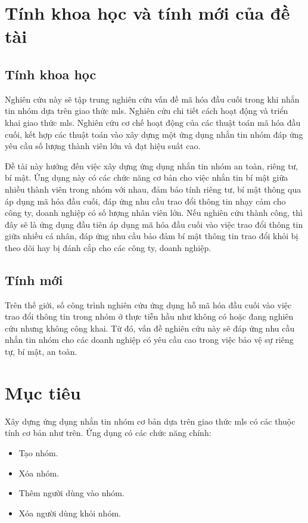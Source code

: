 \documentclass[../main-report.tex]{subfiles}
\begin{document}
\section{Tính khoa học và tính mới của đề tài}
\subsection{Tính khoa học}

Nghiên cứu này sẽ tập trung nghiên cứu vấn đề mã hóa đầu cuối trong khi nhắn tin nhóm dựa trên giao thức \acrshort{mls}. Nghiên cứu chi tiết cách hoạt động và triển khai giao thức \acrshort{mls}. Nghiên cứu cơ chế hoạt động của các thuật toán mã hóa đầu cuối, kết hợp các thuật toán vào xây dựng một ứng dụng nhắn tin nhóm đáp ứng yêu cầu số lượng thành viên lớn và đạt hiệu suất cao.

Đề tài này hướng đến việc xây dựng ứng dụng nhắn tin nhóm an toàn, riêng tư, bí mật. Ứng dụng này có các chức năng cơ bản cho việc nhắn tin bí mật giữa nhiều thành viên trong nhóm với nhau, đảm bảo tính riêng tư, bí mật thông qua áp dụng mã hóa đầu cuối, đáp ứng nhu cầu trao đổi thông tin nhạy cảm cho công ty, doanh nghiệp có số lượng nhân viên lớn. Nếu nghiên cứu thành công, thì đây sẽ là ứng dụng đầu tiên áp dụng mã hóa đầu cuối vào việc trao đổi thông tin giữa nhiều cá nhân, đáp ứng nhu cầu bảo đảm bí mật thông tin trao đổi khỏi bị theo dõi hay bị đánh cắp cho các công ty, doanh nghiệp.


\subsection{Tính mới}

Trên thế giới, số công trình nghiên cứu ứng dụng hỗ mã hóa đầu cuối vào việc trao đổi thông tin trong nhóm ở thực tiễn hầu như không có hoặc đang nghiên cứu nhưng không công khai. Từ đó, vấn đề nghiên cứu này sẽ đáp ứng nhu cầu nhắn tin nhóm cho các doanh nghiệp có yêu cầu cao trong việc bảo vệ sự riêng tự, bí mật, an toàn. 

\section{Mục tiêu}

Xây dựng ứng dụng nhắn tin nhóm cơ bản dựa trên giao thức \acrshort{mls} có các thuộc tính cơ bản như trên. 
Ứng dụng có các chức năng chính:

\begin{itemize}
\item Tạo nhóm.
\item Xóa nhóm.
\item Thêm người dùng vào nhóm.
\item Xóa người dùng khỏi nhóm.
\end{itemize}
\end{document}
